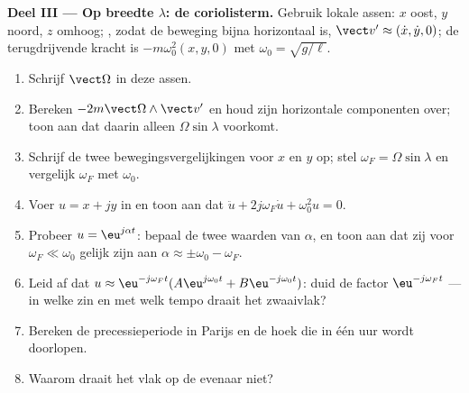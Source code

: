 \begin{problem}
\medskip
\noindent\textbf{Deel III --- Op breedte $\lambda$: de coriolisterm.}
Gebruik lokale assen: $x$ oost, $y$ noord, $z$ omhoog; , zodat de
beweging bijna horizontaal is, $\vect v' \approx (\dot x, \dot y, 0)$; de
terugdrijvende kracht is $-m\omega_0^2(x, y, 0)$ met $\omega_0 = \sqrt{g/\ell}$.
\begin{enumerate}[resume]
  \item Schrijf $\vect\Omega$ in deze assen.
  \item Bereken $-2m\vect\Omega\wedge\vect v'$ en houd zijn horizontale
        componenten over; toon aan dat daarin alleen $\Omega\sin\lambda$ voorkomt.
  \item Schrijf de twee bewegingsvergelijkingen voor $x$ en $y$ op; stel
        $\omega_F = \Omega\sin\lambda$ en vergelijk $\omega_F$ met $\omega_0$.
  \item Voer $u = x + jy$ in en toon aan dat $\ddot u + 2j\omega_F\dot u +
        \omega_0^2u = 0$.
  \item Probeer $u = \eu^{j\alpha t}$: bepaal de twee waarden van $\alpha$, en
        toon aan dat zij voor $\omega_F \ll \omega_0$ gelijk zijn aan $\alpha \approx \pm\omega_0
        - \omega_F$.
  \item Leid af dat $u \approx \eu^{-j\omega_Ft}(A\eu^{j\omega_0t} + B\eu^{-j\omega_0t})$:
        duid de factor $\eu^{-j\omega_Ft}$ --- in welke zin en met welk
        tempo draait het zwaaivlak?
  \item Bereken de precessieperiode in Parijs en de hoek die in één uur
        wordt doorlopen.
  \item Waarom draait het vlak op de evenaar niet?
\end{enumerate}


\end{problem}

